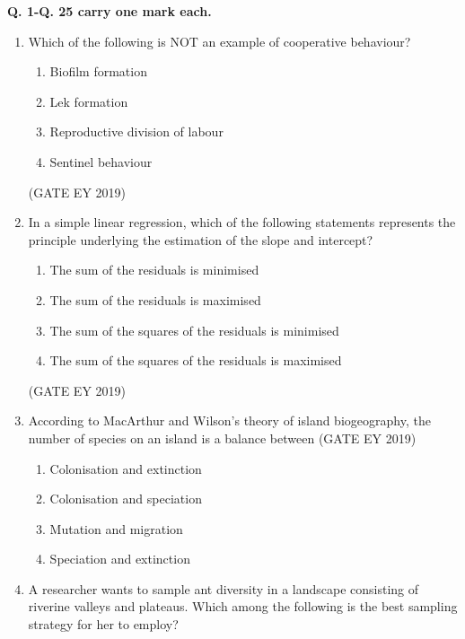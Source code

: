 \documentclass[journal,12pt,onecolumn]{IEEEtran}
\theoremstyle{remark}
\begin{document}
\textbf{Q. 1-Q. 25 carry one mark each.}

\begin{enumerate}[leftmargin=*]
\item Which of the following is NOT an example of cooperative behaviour?

\begin{multicols}{2}
\begin{enumerate}[nosep]
\item Biofilm formation
\item Lek formation
\item Reproductive division of labour
\item Sentinel behaviour
\end{enumerate}
\end{multicols}
\hfill{(GATE EY 2019)}
\item In a simple linear regression, which of the following statements represents the principle underlying the estimation of the slope and intercept?

\begin{enumerate}[nosep]
\item The sum of the residuals is minimised
\item The sum of the residuals is maximised
\item The sum of the squares of the residuals is minimised
\item The sum of the squares of the residuals is maximised
\end{enumerate}
\hfill{(GATE EY 2019)}
\item According to MacArthur and Wilson's theory of island biogeography, the number of species on an island is a balance between
\hfill{(GATE EY 2019)}

\begin{multicols}{2}
\begin{enumerate}[nosep]
\item Colonisation and extinction
\item Colonisation and speciation
\item Mutation and migration
\item Speciation and extinction
\end{enumerate}
\end{multicols}
\item A researcher wants to sample ant diversity in a landscape consisting of riverine valleys and plateaus. Which among the following is the best sampling strategy for her to employ?


\end{enumerate}
\end{document}

